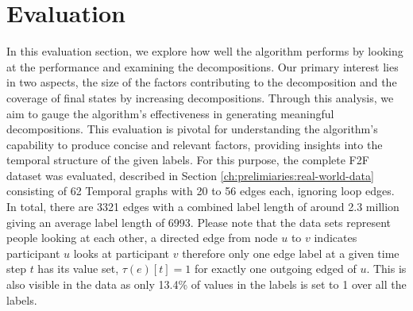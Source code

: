 
\chapter{Evaluation}
\label{ch:Evaluation}
In this evaluation section, we explore how well the algorithm performs by looking at the performance and examining the decompositions.
Our primary interest lies in two aspects, the size of the factors contributing to the decomposition and the coverage of final states by increasing decompositions.
Through this analysis, we aim to gauge the algorithm's effectiveness in generating meaningful decompositions.
This evaluation is pivotal for understanding the algorithm's capability to produce concise and relevant factors, providing insights into the temporal structure of the given labels.
For this purpose, the complete F2F dataset was evaluated, described in Section \ref{ch:prelimiaries:real-world-data} consisting of 62 Temporal graphs with 20 to 56 edges each, ignoring loop edges.
In total, there are 3321 edges with a combined label length of around 2.3 million giving an average label length of 6993.
Please note that the data sets represent people looking at each other, a directed edge from node $u$ to $v$ indicates participant $u$ looks at participant $v$ therefore only one edge label at a given time step $t$ has its value set, $\tau(e)[t] = 1$ for exactly one outgoing edged of $u$.
This is also visible in the data as only 13.4\% of values in the labels is set to 1 over all the labels.

